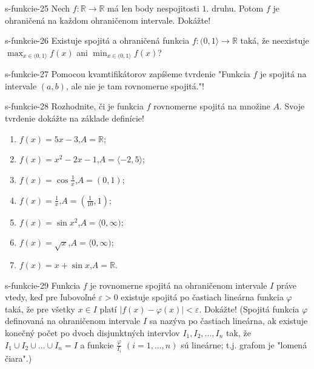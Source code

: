   \begin{defproblem}{s-funkcie-25}
  Nech $f: \mathbb{R} \rightarrow \mathbb{R}$ má len body nespojitosti $1.$ druhu. Potom $f$ je ohraničená na každom ohraničenom intervale. Dokážte!
  \end{defproblem}

  \begin{defproblem}{s-funkcie-26}
  Existuje spojitá a ohraničená funkcia $f:(0,1 \rangle \rightarrow \mathbb{R}$ taká, že neexistuje $\max_{x \in (0,1 \rangle} f(x)$ ani $\min_{x \in (0,1 \rangle} f(x)$?
  \end{defproblem}

  \begin{defproblem}{s-funkcie-27}
  Pomocou kvamtifikátorov zapíšeme tvrdenie "Funkcia $f$ je spojitá na intervale $(a,b)$, ale nie je tam rovnomerne spojitá."!
  \end{defproblem}

  \begin{defproblem}{s-funkcie-28}
  Rozhodnite, či je funkcia $f$ rovnomerne spojitá na množine $A$. Svoje tvrdenie dokážte na základe definície!
  \begin{enumerate}
  \item $f(x)=5x-3$,$A=\mathbb{R}$;
  \item $f(x)=x^2-2x-1$,$A=\langle -2,5 \rangle$;
  \item $f(x)=\cos \frac{1}{x}$,$A=(0,1)$;
  \item $f(x)=\frac{1}{x}$,$A=(\frac{1}{10},1)$;
  \item $f(x)=\sin x^2$,$A=\langle 0,\infty)$;
  \item $f(x)=\sqrt{x}$,$A=\langle 0,\infty)$;
  \item $f(x)=x+\sin x$,$A=\mathbb{R}$.
  \end{enumerate}
  \end{defproblem}

  \begin{defproblem}{s-funkcie-29}
  Funkcia $f$ je rovnomerne spojitá na ohraničenom intervale $I$ práve vtedy, keď pre ľubovoľné $\varepsilon >0$ existuje spojitá po častiach lineárna funkcia $\varphi$ taká, že pre všetky $x \in I$ platí $|f(x)-\varphi(x)|< \varepsilon$. Dokážte! (Spojitá funkcia $\varphi$ definovaná na ohraničenom intervale $I$ sa nazýva po častiach lineárna, ak existuje konečný počet po dvoch disjunktných intervlov $I_1,I_2,...,I_n$ tak, že $I_1 \cup I_2 \cup ... \cup I_n=I$ a funkcie $\frac{\varphi}{I_i}$ $(i=1,...,n)$ sú lineárne; t.j. grafom je "lomená čiara".)
  \end{defproblem}

